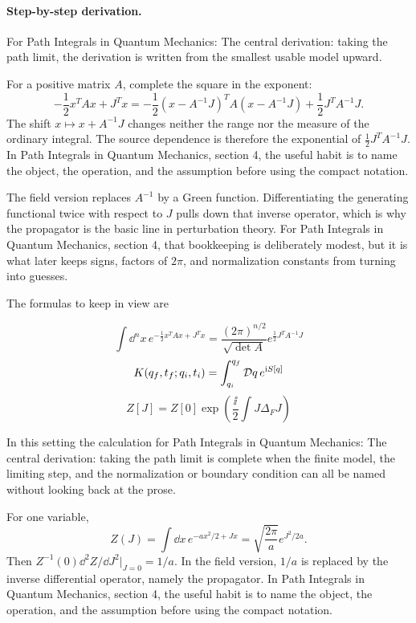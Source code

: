 \paragraph{Step-by-step derivation.}

For Path Integrals in Quantum Mechanics: The central derivation: taking the path limit, the derivation is written from the smallest usable model upward.

For a positive matrix \(A\), complete the square in the exponent:
\[
  -\frac12x^TAx+J^Tx
  =
  -\frac12(x-A^{-1}J)^TA(x-A^{-1}J)
  +\frac12J^TA^{-1}J.
\]
The shift \(x\mapsto x+A^{-1}J\) changes neither the range nor the measure of the ordinary integral.  The source dependence is therefore the exponential of \(\frac12J^TA^{-1}J\).  In Path Integrals in Quantum Mechanics, section 4, the useful habit is to name the object, the operation, and the assumption before using the compact notation.

The field version replaces \(A^{-1}\) by a Green function.  Differentiating the generating functional twice with respect to \(J\) pulls down that inverse operator, which is why the propagator is the basic line in perturbation theory.  For Path Integrals in Quantum Mechanics, section 4, that bookkeeping is deliberately modest, but it is what later keeps signs, factors of \(2\pi\), and normalization constants from turning into guesses.

The formulas to keep in view are

\[
  \int\dd^n x\,e^{-\frac12x^TAx+J^Tx}=\frac{(2\pi)^{n/2}}{\sqrt{\det A}}e^{\frac12J^TA^{-1}J}
\]
\[
  K(q_f,t_f;q_i,t_i)=\int_{q_i}^{q_f}\mathcal D q\,e^{\mathrm i S[q]}
\]
\[
  Z[J]=Z[0]\exp\left(\frac{\ii}{2}\int J\Delta_FJ\right)
\]

In this setting the calculation for Path Integrals in Quantum Mechanics: The central derivation: taking the path limit is complete when the finite model, the limiting step, and the normalization or boundary condition can all be named without looking back at the prose.




\begin{example}
For one variable,
\[
  Z(J)=\int\dd x\,e^{-ax^2/2+Jx}
  =\sqrt{\frac{2\pi}{a}}e^{J^2/2a}.
\]
Then \(Z^{-1}(0)\dd^2Z/\dd J^2|_{J=0}=1/a\).  In the field version, \(1/a\) is replaced by the inverse differential operator, namely the propagator.  In Path Integrals in Quantum Mechanics, section 4, the useful habit is to name the object, the operation, and the assumption before using the compact notation.
\end{example}



